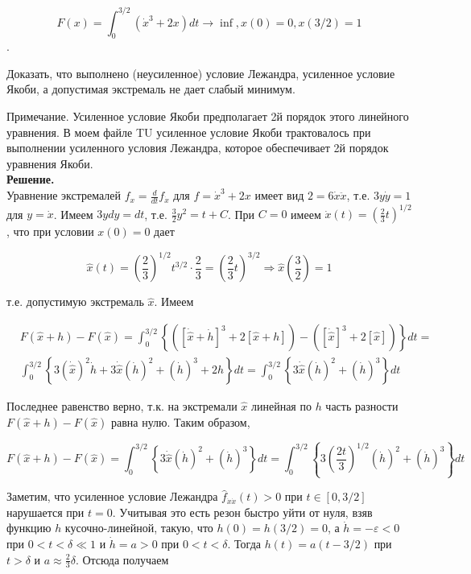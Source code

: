 \begin{task}
    $$F(x)=\int_{0}^{3 / 2}\left(\dot{x}^{3}+2 x\right) d t \rightarrow \inf , x(0)=0, x(3 / 2)=1$$. 
    
    Доказать, что выполнено (неусиленное) условие Лежандра, усиленное условие Якоби, а допустимая экстремаль не дает слабый минимум.
    
    Примечание. Усиленное условие Якоби предполагает 2й порядок этого линейного уравнения. В моем файле TU усиленное условие Якоби трактовалось при выполнении усиленного условия Лежандра, которое обеспечивает 2й порядок уравнения Якоби.\\
    \textbf{Решение.} \\
    Уравнение экстремалей $f_{x}=\frac{d}{d t} f_{\dot{x}}$ для $f=\dot{x}^{3}+2 x$ имеет вид $2=6 \dot{x} \ddot{x}$, т.е. $3 y \dot{y}=1$ для $y=\dot{x}$. Имеем $3 y d y=d t$, т.е. $\frac{3}{2} y^{2}=t+C$. При $C=0$ имеем $\dot{x}(t)=\left(\frac{2}{3} t\right)^{1 / 2}$, что при условии $x(0)=0$ дает
    
    $$
    \hat{x}(t)=\left(\frac{2}{3}\right)^{1 / 2} t^{3 / 2} \cdot \frac{2}{3}=\left(\frac{2}{3} t\right)^{3 / 2} \Longrightarrow \hat{x}\left(\frac{3}{2}\right)=1
    $$
    
    т.е. допустимую экстремаль $\hat{x}$. Имеем
    
    $$
    \begin{aligned}
    & F(\hat{x}+h)-F(\hat{x})=\int_{0}^{3 / 2}\left\{\left([\dot{\hat{x}}+\dot{h}]^{3}+2[\hat{x}+h]\right)-\left([\dot{\hat{x}}]^{3}+2[\hat{x}]\right)\right\} d t= \\
    & \int_{0}^{3 / 2}\left\{3(\dot{\hat{x}})^{2} \dot{h}+3 \dot{\hat{x}}(\dot{h})^{2}+(\dot{h})^{3}+2 h\right\} d t=\int_{0}^{3 / 2}\left\{3 \dot{\hat{x}}(\dot{h})^{2}+(\dot{h})^{3}\right\} d t
    \end{aligned}
    $$
    
    Последнее равенство верно, т.к. на экстремали $\hat{x}$ линейная по $h$ часть разности $F(\hat{x}+h)-F(\hat{x})$ равна нулю. Таким образом,
    
    $$
    F(\hat{x}+h)-F(\hat{x})=\int_{0}^{3 / 2}\left\{3 \dot{\hat{x}}(\dot{h})^{2}+(\dot{h})^{3}\right\} d t=\int_{0}^{3 / 2}\left\{3\left(\frac{2 t}{3}\right)^{1 / 2}(\dot{h})^{2}+(\dot{h})^{3}\right\} d t
    $$
    
    Заметим, что усиленное условие Лежандра $\hat{f}_{\dot{x} \dot{x}}(t)>0$ при $t \in[0,3 / 2]$ нарушается при $t=0$. Учитывая это есть резон быстро уйти от нуля, взяв функцию $h$ кусочно-линейной, такую, что $h(0)=h(3 / 2)=0$, а $\dot{h}=-\varepsilon<0$ при $0<t<\delta \ll 1$ и $\dot{h}=a>0$ при $0<t<\delta$. Тогда $h(t)=a(t-3 / 2)$ при $t>\delta$ и $a \approx \frac{2}{3} \delta$. Отсюда получаем
    

\end{task}
